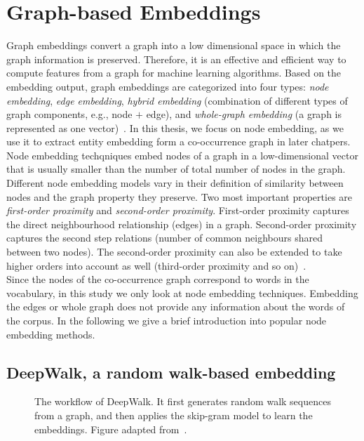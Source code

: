\section{Graph-based Embeddings}
\label{sec:graph_embeddings}
Graph embeddings convert a graph into a low dimensional space in which the graph information is preserved. Therefore, it is an effective and efficient way to compute features from a graph for machine learning algorithms. Based on the embedding output, graph embeddings are categorized into four types: \emph{node embedding}, \emph{edge embedding}, \emph{hybrid embedding} (combination of different types of graph components, e.g., node $+$ edge), and  \emph{whole-graph embedding} (a graph is represented as one vector)~. In this thesis, we focus on node embedding, as we use it to extract entity embedding form a co-occurrence graph in later chatpers. Node embedding techqniques embed nodes of a graph in a low-dimensional vector that is usually smaller than the number of total number of nodes in the graph. Different node embedding models vary in their definition of similarity between nodes and the graph property they preserve. Two most important properties are \emph{first-order proximity} and \emph{second-order proximity}. First-order proximity captures the direct neighbourhood relationship (edges) in a graph. Second-order proximity captures the second step relations (number of common neighbours shared between two nodes). The second-order proximity can also be extended to take higher orders into account as well (third-order proximity and so on)~.\\
Since the nodes of the co-occurrence graph correspond to words in the vocabulary, in this study we only look at node embedding techniques. Embedding the edges or whole graph does not provide any information about the words of the corpus. In the following we give a brief introduction into popular node embedding methods. 
\subsection{DeepWalk, a random walk-based embedding}
\label{subsec:DeepWalk}
\begin{figure}
\centering 
\resizebox{0.8\textwidth}{0.35\textwidth}{      

}
\caption{The workflow of DeepWalk. It first generates random walk sequences from a graph, and then applies the skip-gram model to learn the embeddings. Figure adapted from~.}
\label{fig:deepwalk}
\end{figure}

